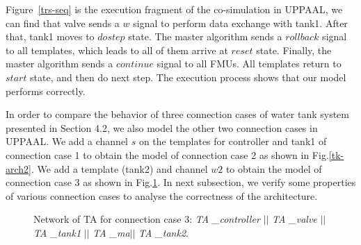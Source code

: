 Figure~\ref{trs-seq} is the execution fragment of the co-simulation in UPPAAL, we can find that valve sends a $w$ signal to perform data exchange with tank1. After that, tank1 moves to $dostep$ state. The master algorithm sends a $rollback$ signal to all templates, which leads to all of them arrive at $reset$ state. Finally, the master algorithm sends a $continue$ signal to all FMUs. All templates return to $start$ state, and then do next step. The execution process shows that our model performs correctly.

In order to compare the behavior of three connection cases of water tank system presented in Section 4.2, we also model the other two connection cases in UPPAAL. We add a channel $s$ on the templates for controller and tank1 of connection case 1 to obtain the model of connection case 2 as shown in Fig.\ref{tk-arch2}. We add a template (tank2) and channel $w2$ to obtain the model of connection case 3 as shown in Fig.\ref{arc3}. In next subsection, we verify some properties of various connection cases to analyse the correctness of the architecture.
\begin{figure}[htbp]
\end{figure}
\begin{figure}[htbp]
	\caption{Network of TA for connection case 3: \emph{TA \_{controller}} $\vert\vert$ \emph{TA \_{valve}} $\vert\vert$ \emph{TA \_{tank1}} $\vert\vert$ \emph{TA \_{ma}}$\vert\vert$ \emph{TA \_{tank2}}.}\label{arc3}
\end{figure}

